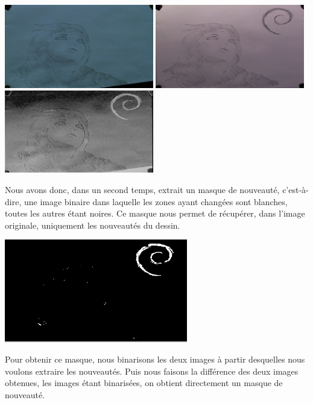 \begin{center}
\includegraphics[width=6.5cm]{images/capImage1-7.png}
\includegraphics[width=6.5cm]{images/capImage1-9.png}
\hfill\includegraphics[width=6.5cm]{images/simpleDiff.png}\newline
{}
\end{center}

Nous avons donc, dans un second temps, extrait un masque de nouveauté, c'est-à-dire, une image binaire dans laquelle les zones ayant changées sont blanches, toutes les autres étant noires. Ce masque nous permet de récupérer, dans l'image originale, uniquement les nouveautés du dessin.


\begin{center}
\includegraphics[width=8cm]{images/masqueDiff.png}\newline
{}
\end{center}

Pour obtenir ce masque, nous binarisons les deux images à partir desquelles nous voulons extraire les nouveautés. Puis nous faisons la différence des deux images obtenues, les images étant binarisées, on obtient directement un masque de nouveauté.


